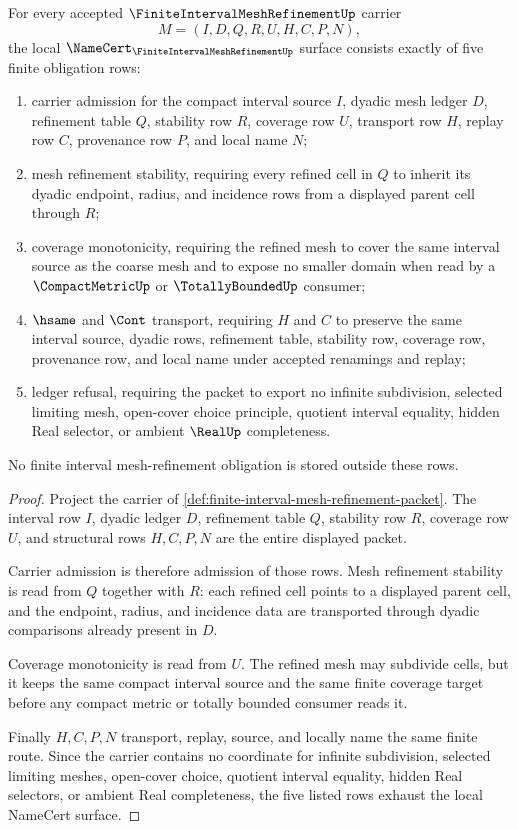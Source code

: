 \begin{theorem}
\label{thm:finite-interval-mesh-refinement-namecert-obligations}
For every accepted $\FiniteIntervalMeshRefinementUp$ carrier
$$
M=(I,D,Q,R,U,H,C,P,N),
$$
the local $\NameCert_{\FiniteIntervalMeshRefinementUp}$ surface consists exactly of five finite obligation rows:
\begin{enumerate}
\item carrier admission for the compact interval source $I$, dyadic mesh ledger $D$, refinement table $Q$, stability row $R$, coverage row $U$, transport row $H$, replay row $C$, provenance row $P$, and local name $N$;
\item mesh refinement stability, requiring every refined cell in $Q$ to inherit its dyadic endpoint, radius, and incidence rows from a displayed parent cell through $R$;
\item coverage monotonicity, requiring the refined mesh to cover the same interval source as the coarse mesh and to expose no smaller domain when read by a $\CompactMetricUp$ or $\TotallyBoundedUp$ consumer;
\item $\hsame$ and $\Cont$ transport, requiring $H$ and $C$ to preserve the same interval source, dyadic rows, refinement table, stability row, coverage row, provenance row, and local name under accepted renamings and replay;
\item ledger refusal, requiring the packet to export no infinite subdivision, selected limiting mesh, open-cover choice principle, quotient interval equality, hidden Real selector, or ambient $\RealUp$ completeness.
\end{enumerate}
No finite interval mesh-refinement obligation is stored outside these rows.
\end{theorem}
\begin{proof}
Project the carrier of \autoref{def:finite-interval-mesh-refinement-packet}. The interval row $I$, dyadic ledger $D$, refinement table $Q$, stability row $R$, coverage row $U$, and structural rows $H,C,P,N$ are the entire displayed packet.

Carrier admission is therefore admission of those rows. Mesh refinement stability is read from $Q$ together with $R$: each refined cell points to a displayed parent cell, and the endpoint, radius, and incidence data are transported through dyadic comparisons already present in $D$.

Coverage monotonicity is read from $U$. The refined mesh may subdivide cells, but it keeps the same compact interval source and the same finite coverage target before any compact metric or totally bounded consumer reads it.

Finally $H,C,P,N$ transport, replay, source, and locally name the same finite route. Since the carrier contains no coordinate for infinite subdivision, selected limiting meshes, open-cover choice, quotient interval equality, hidden Real selectors, or ambient Real completeness, the five listed rows exhaust the local NameCert surface.
\end{proof}

